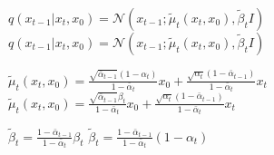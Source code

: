 
\begin{frame}
	$q(x_{t-1} | x_t, x_0) = \mathcal{N}\left(x_{t-1} ; \tilde{\mu}_{t}(x_t, x_0), \tilde{\beta}_t I\right)$
	$q(x_{t-1} | x_t, x_0) = \mathcal{N}\left(x_{t-1} ; \tilde{\mu}_{t}(x_t, x_0), \tilde{\beta}_t I\right)$
	
	$\tilde{\mu}_{t}(x_t, x_0) = \frac{\sqrt{\bar{\alpha}_{t-1}} (1 - \alpha_t)}{1 - \bar{\alpha}_t} x_0 + \frac{\sqrt{\alpha_t} (1 - \bar{\alpha}_{t-1})}{1 - \bar{\alpha}_t} x_t$
	$\tilde{\mu}_{t}(x_t, x_0) = \frac{\sqrt{\bar{\alpha}_{t-1}} \beta_t}{1 - \bar{\alpha}_t} x_0 + \frac{\sqrt{\alpha_t} (1 - \bar{\alpha}_{t-1})}{1 - \bar{\alpha}_t} x_t$
	
	$\tilde{\beta}_t = \frac{1 - \bar{\alpha}_{t-1}}{1 - \bar{\alpha}_t} \beta_t$
	$\tilde{\beta}_t = \frac{1 - \bar{\alpha}_{t-1}}{1 - \bar{\alpha}_t} (1 - \alpha_t)$
	
\end{frame}





